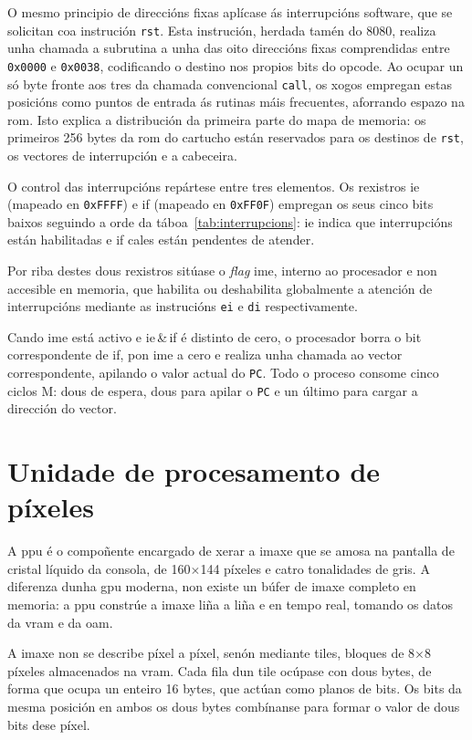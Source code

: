 O mesmo principio de direccións fixas aplícase ás interrupcións software,
que se solicitan coa instrución \texttt{rst}.
Esta instrución, herdada tamén do 8080, realiza unha chamada a subrutina
a unha das oito direccións fixas comprendidas entre \texttt{0x0000} e \texttt{0x0038},
codificando o destino nos propios bits do opcode.
Ao ocupar un só byte fronte aos tres da chamada convencional \texttt{call},
os xogos empregan estas posicións como puntos de entrada ás rutinas máis frecuentes,
aforrando espazo na \acrshort{rom}.
Isto explica a distribución da primeira parte do mapa de memoria:
os primeiros 256 bytes da \acrshort{rom} do cartucho están reservados
para os destinos de \texttt{rst}, os vectores de interrupción e a cabeceira.

O control das interrupcións repártese entre tres elementos.
Os rexistros \acrshort{ie} (mapeado en \texttt{0xFFFF})
e \acrfull{if} (mapeado en \texttt{0xFF0F}) empregan os seus cinco bits baixos
seguindo a orde da táboa~\ref{tab:interrupcions}:
\acrshort{ie} indica que interrupcións están habilitadas
e \acrshort{if} cales están pendentes de atender.

Por riba destes dous rexistros sitúase o \textit{flag} \acrfull{ime},
interno ao procesador e non accesible en memoria,
que habilita ou deshabilita globalmente a atención de interrupcións mediante
as instrucións \texttt{ei} e \texttt{di} respectivamente.

Cando \acrshort{ime} está activo e \acrshort{ie}\,\&\,\acrshort{if} é distinto de cero,
o procesador borra o bit correspondente de \acrshort{if}, pon \acrshort{ime} a cero
e realiza unha chamada ao vector correspondente,
apilando o valor actual do \texttt{PC}.
Todo o proceso consome cinco ciclos M: dous de espera, dous para apilar o \texttt{PC}
e un último para cargar a dirección do vector.

\section{Unidade de procesamento de píxeles}
\label{sec:ppu}

A \acrshort{ppu} é o compoñente encargado de xerar a imaxe que se amosa na pantalla
de cristal líquido da consola, de 160$\times$144 píxeles e catro tonalidades de gris.
A diferenza dunha \acrshort{gpu} moderna, non existe un búfer de imaxe completo en memoria:
a \acrshort{ppu} constrúe a imaxe liña a liña e en tempo real,
tomando os datos da \acrshort{vram} e da \acrshort{oam}.

A imaxe non se describe píxel a píxel, senón mediante \glspl{tile}, bloques de
8$\times$8 píxeles almacenados na \acrshort{vram}. Cada fila dun \gls{tile} ocúpase
con dous bytes, de forma que ocupa un enteiro 16 bytes, 
que actúan como planos de bits. Os bits da mesma posición en ambos
os dous bytes combínanse para formar o valor de dous bits dese píxel.

